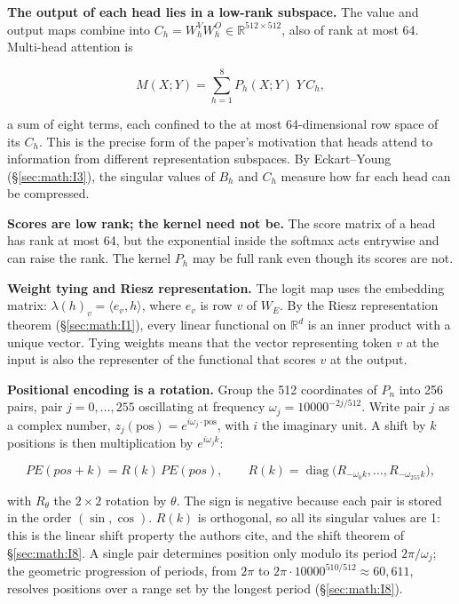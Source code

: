 \textbf{The output of each head lies in a low-rank subspace.} The value
and output maps combine into \(C_h = W_h^V W_h^O \in
\mathbb{R}^{512\times 512}\), also of rank at most 64. Multi-head
attention is

\[
M(X;Y) = \sum_{h=1}^{8} P_h(X;Y)\; Y\, C_h ,
\]

a sum of eight terms, each confined to the at most 64-dimensional row
space of its \(C_h\). This is the precise form of the paper's motivation
that heads attend to information from different representation
subspaces. By Eckart--Young (\S\ref{sec:math:I3}), the singular values of \(B_h\) and \(C_h\)
measure how far each head can be compressed.

\textbf{Scores are low rank; the kernel need not be.} The score matrix
of a head has rank at most 64, but the exponential inside the softmax
acts entrywise and can raise the rank. The kernel \(P_h\) may be full rank
even though its scores are not.

\textbf{Weight tying and Riesz representation.} The logit map uses the
embedding matrix: \(\lambda(h)_v = \langle e_v, h\rangle\), where \(e_v\) is row \(v\) of \(W_E\). By
the Riesz representation theorem (\S\ref{sec:math:I1}), every linear functional on
\(\mathbb{R}^{d}\) is an inner product with a unique vector. Tying
weights means that the vector representing token \(v\) at the input is also
the representer of the functional that scores \(v\) at the output.

\textbf{Positional encoding is a rotation.} Group the 512 coordinates of
\(P_n\) into 256 pairs, pair \(j = 0, \ldots, 255\) oscillating at frequency \(\omega_j =
10000^{-2j/512}\). Write pair \(j\) as a complex number, \(z_j(\mathrm{pos}) =
e^{i\omega_j \cdot \mathrm{pos}}\), with \(i\) the imaginary unit. A shift by \(k\) positions is
then multiplication by \(e^{i\omega_j k}\):

\[
PE(pos + k) = R(k)\, PE(pos), \qquad R(k) = \operatorname{diag}\big(R_{-\omega_0 k}, \dots, R_{-\omega_{255} k}\big),
\]

with \(R_\theta\) the \(2 \times 2\) rotation by \(\theta\). The sign is negative because each
pair is stored in the order \((\sin, \cos)\). \(R(k)\) is orthogonal, so all its
singular values are 1: this is the linear shift property the authors
cite, and the shift theorem of \S\ref{sec:math:I8}. A single pair determines position
only modulo its period \(2\pi/\omega_j\); the geometric progression of periods,
from \(2\pi\) to \(2\pi \cdot 10000^{510/512} \approx 60{,}611\), resolves positions over a
range set by the longest period (\S\ref{sec:math:I8}).

